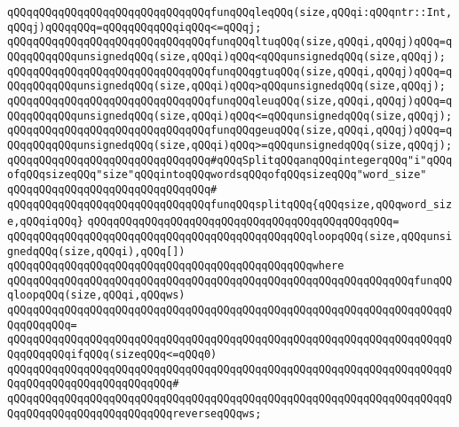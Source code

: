 \verb|qQQqqQQqqQQqqQQqqQQqqQQqqQQqqQQqfunqQQqleqQQq(size,qQQqi:qQQqntr::Int,qQQqj)qQQqqQQq=qQQqqQQqqQQqiqQQq<=qQQqj;|\newline
\newline
\verb|qQQqqQQqqQQqqQQqqQQqqQQqqQQqqQQqfunqQQqltuqQQq(size,qQQqi,qQQqj)qQQq=qQQqqQQqqQQqunsignedqQQq(size,qQQqi)qQQq<qQQqunsignedqQQq(size,qQQqj);|\newline
\verb|qQQqqQQqqQQqqQQqqQQqqQQqqQQqqQQqfunqQQqgtuqQQq(size,qQQqi,qQQqj)qQQq=qQQqqQQqqQQqunsignedqQQq(size,qQQqi)qQQq>qQQqunsignedqQQq(size,qQQqj);|\newline
\verb|qQQqqQQqqQQqqQQqqQQqqQQqqQQqqQQqfunqQQqleuqQQq(size,qQQqi,qQQqj)qQQq=qQQqqQQqqQQqunsignedqQQq(size,qQQqi)qQQq<=qQQqunsignedqQQq(size,qQQqj);|\newline
\verb|qQQqqQQqqQQqqQQqqQQqqQQqqQQqqQQqfunqQQqgeuqQQq(size,qQQqi,qQQqj)qQQq=qQQqqQQqqQQqunsignedqQQq(size,qQQqi)qQQq>=qQQqunsignedqQQq(size,qQQqj);|\newline
\newline
\verb|qQQqqQQqqQQqqQQqqQQqqQQqqQQqqQQq#qQQqSplitqQQqanqQQqintegerqQQq"i"qQQqofqQQqsizeqQQq"size"qQQqintoqQQqwordsqQQqofqQQqsizeqQQq"word_size"|\newline
\verb|qQQqqQQqqQQqqQQqqQQqqQQqqQQqqQQq#|\newline
\verb|qQQqqQQqqQQqqQQqqQQqqQQqqQQqqQQqfunqQQqsplitqQQq{qQQqsize,qQQqword_size,qQQqiqQQq}|\newline
\verb|qQQqqQQqqQQqqQQqqQQqqQQqqQQqqQQqqQQqqQQqqQQqqQQq=|\newline
\verb|qQQqqQQqqQQqqQQqqQQqqQQqqQQqqQQqqQQqqQQqqQQqqQQqloopqQQq(size,qQQqunsignedqQQq(size,qQQqi),qQQq[])|\newline
\verb|qQQqqQQqqQQqqQQqqQQqqQQqqQQqqQQqqQQqqQQqqQQqqQQqwhere|\newline
\verb|qQQqqQQqqQQqqQQqqQQqqQQqqQQqqQQqqQQqqQQqqQQqqQQqqQQqqQQqqQQqqQQqfunqQQqloopqQQq(size,qQQqi,qQQqws)|\newline
\verb|qQQqqQQqqQQqqQQqqQQqqQQqqQQqqQQqqQQqqQQqqQQqqQQqqQQqqQQqqQQqqQQqqQQqqQQqqQQqqQQq=|\newline
\verb|qQQqqQQqqQQqqQQqqQQqqQQqqQQqqQQqqQQqqQQqqQQqqQQqqQQqqQQqqQQqqQQqqQQqqQQqqQQqqQQqifqQQq(sizeqQQq<=qQQq0)|\newline
\verb|qQQqqQQqqQQqqQQqqQQqqQQqqQQqqQQqqQQqqQQqqQQqqQQqqQQqqQQqqQQqqQQqqQQqqQQqqQQqqQQqqQQqqQQqqQQqqQQq#|\newline
\verb|qQQqqQQqqQQqqQQqqQQqqQQqqQQqqQQqqQQqqQQqqQQqqQQqqQQqqQQqqQQqqQQqqQQqqQQqqQQqqQQqqQQqqQQqqQQqqQQqreverseqQQqws;|\newline
